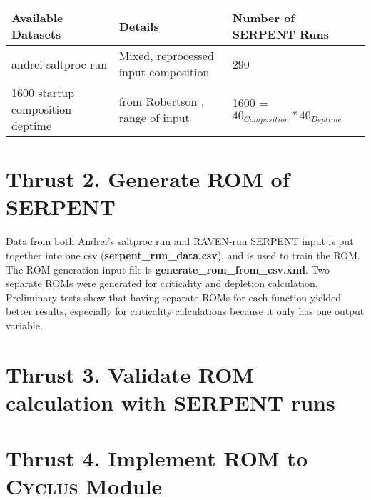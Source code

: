 \documentclass{article}
\newcommand{\Cyclus}{\textsc{Cyclus}\xspace}%
\begin{document}
\begin{table}
\begin{center}
\begin{tabular}{ l l l}
    \hline
    Available Datasets & Details & Number of SERPENT Runs \\
    \hline
    andrei saltproc run & Mixed, reprocessed input composition & 290 \\
    1600 startup composition deptime & from Robertson \cite{robertson_conceptual_1971}, range of input & 1600 = $40_{Composition} * 40_{Deptime}$ \\
    \hline
\end{tabular}
\label{tab:data}
\end{center}
\end{table}

\section*{Thrust 2. Generate \gls{ROM} of SERPENT}
Data from both Andrei's saltproc run and RAVEN-run SERPENT
input is put together into one csv (\textbf{serpent\_run\_data.csv}), and is used to train the ROM. The ROM generation input file
is \textbf{generate\_rom\_from\_csv.xml}. 
Two separate \glspl{ROM} were generated for criticality and depletion calculation. Preliminary tests
show that having separate ROMs for each function yielded better results, especially for criticality
calculations because it only has one output variable. 

\section*{Thrust 3. Validate \gls{ROM} calculation with SERPENT runs}


\section*{Thrust 4. Implement \gls{ROM} to \Cyclus Module}


\pagebreak
\end{document}
